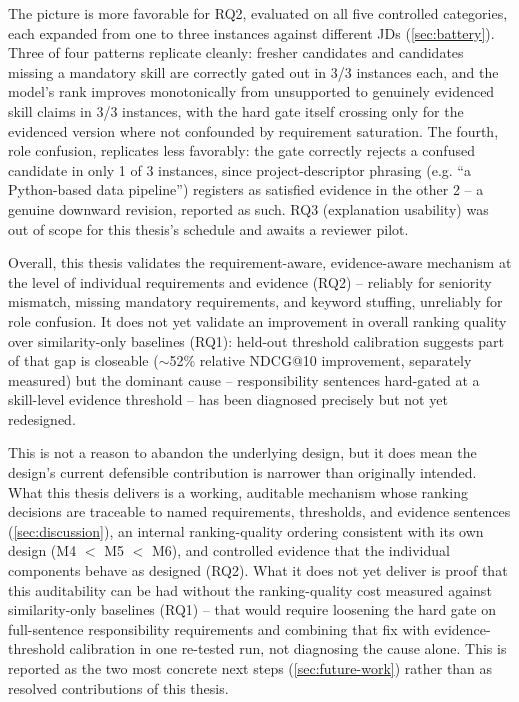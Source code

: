 \documentclass[12pt,a4paper,oneside]{report}
\begin{document}
The picture is more favorable for RQ2, evaluated on all five controlled categories, each expanded from one to three instances against different JDs (\cref{sec:battery}). Three of four patterns replicate cleanly: fresher candidates and candidates missing a mandatory skill are correctly gated out in 3/3 instances each, and the model's rank improves monotonically from unsupported to genuinely evidenced skill claims in 3/3 instances, with the hard gate itself crossing only for the evidenced version where not confounded by requirement saturation. The fourth, role confusion, replicates less favorably: the gate correctly rejects a confused candidate in only 1 of 3 instances, since project-descriptor phrasing (e.g. ``a Python-based data pipeline'') registers as satisfied evidence in the other 2 -- a genuine downward revision, reported as such. RQ3 (explanation usability) was out of scope for this thesis's schedule and awaits a reviewer pilot.

Overall, this thesis validates the requirement-aware, evidence-aware mechanism at the level of individual requirements and evidence (RQ2) -- reliably for seniority mismatch, missing mandatory requirements, and keyword stuffing, unreliably for role confusion. It does not yet validate an improvement in overall ranking quality over similarity-only baselines (RQ1): held-out threshold calibration suggests part of that gap is closeable ($\sim$52\% relative NDCG@10 improvement, separately measured) but the dominant cause -- responsibility sentences hard-gated at a skill-level evidence threshold -- has been diagnosed precisely but not yet redesigned.

This is not a reason to abandon the underlying design, but it does mean the design's current defensible contribution is narrower than originally intended. What this thesis delivers is a working, auditable mechanism whose ranking decisions are traceable to named requirements, thresholds, and evidence sentences (\cref{sec:discussion}), an internal ranking-quality ordering consistent with its own design (M4 $<$ M5 $<$ M6), and controlled evidence that the individual components behave as designed (RQ2). What it does not yet deliver is proof that this auditability can be had without the ranking-quality cost measured against similarity-only baselines (RQ1) -- that would require loosening the hard gate on full-sentence responsibility requirements and combining that fix with evidence-threshold calibration in one re-tested run, not diagnosing the cause alone. This is reported as the two most concrete next steps (\cref{sec:future-work}) rather than as resolved contributions of this thesis.
\end{document}
